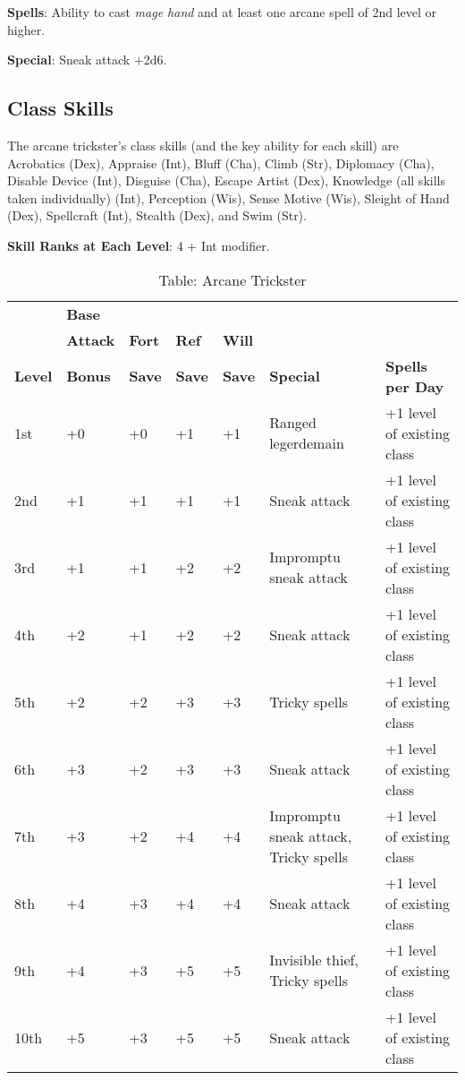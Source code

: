 \textbf{Spells}: Ability to cast \textit{mage hand }and at least one arcane spell of 2nd level or higher.
				
\textbf{Special}: Sneak attack +2d6.
				
\subsection{Class Skills}

				
The arcane trickster's class skills (and the key ability for each skill) are Acrobatics (Dex), Appraise (Int), Bluff (Cha), Climb (Str), Diplomacy (Cha), Disable Device (Int), Disguise (Cha), Escape Artist (Dex), Knowledge (all skills taken individually) (Int), Perception (Wis), Sense Motive (Wis), Sleight of Hand (Dex), Spellcraft (Int), Stealth (Dex), and Swim (Str).
				
\textbf{Skill Ranks at Each Level}: 4 + Int modifier.
	
\begin{table}[]
\sffamily
\caption{Table: Arcane Trickster}
\begin{tabular}{lllllll}
      & \textbf{Base} & & & & & \\ 
      & \textbf{Attack} & \textbf{Fort} & \textbf{Ref} & \textbf{Will} & & \\
\textbf{Level} & \textbf{Bonus }& \textbf{Save }&\textbf{ Save }& \textbf{Save }& \textbf{Special }& \textbf{Spells per Day}\\
1st & +0 & +0 & +1 & +1 & Ranged legerdemain & +1 level of existing class\\
2nd & +1 & +1 & +1 & +1 & Sneak attack & +1 level of existing class\\
3rd & +1 & +1 & +2 & +2 & Impromptu sneak attack & +1 level of existing class\\
4th & +2 & +1 & +2 & +2 & Sneak attack & +1 level of existing class\\
5th & +2 & +2 & +3 & +3 & Tricky spells & +1 level of existing class\\
6th & +3 & +2 & +3 & +3 & Sneak attack & +1 level of existing class\\
7th & +3 & +2 & +4 & +4 & Impromptu sneak attack, Tricky spells & +1 level of existing class\\
8th & +4 & +3 & +4 & +4 & Sneak attack & +1 level of existing class\\
9th & +4 & +3 & +5 & +5 & Invisible thief, Tricky spells & +1 level of existing class\\
10th & +5 & +3 & +5 & +5 & Sneak attack & +1 level of existing class\\
\end{tabular}
\end{table}
			
